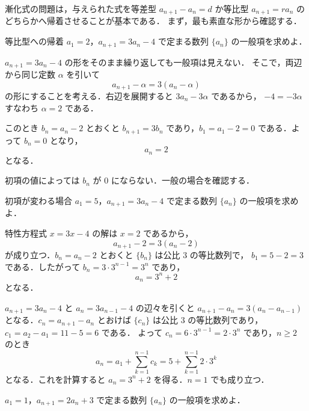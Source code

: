 \documentclass[lualatex,paper=b5j,fontsize=10pt,twoside]{jlreq}
\begin{document}
\MakeMathMagazineTitle

漸化式の問題は，与えられた式を等差型 $a_{n+1}-a_n=d$ か等比型
$a_{n+1}=ra_n$ のどちらかへ帰着させることが基本である．
まず，最も素直な形から確認する．

\begin{mmexample}[1.1]{等比型への帰着}
$a_1=2$，$a_{n+1}=3a_n-4$ で定まる数列 $\{a_n\}$ の一般項を求めよ．
\end{mmexample}

\begin{mmsolution}
$a_{n+1}=3a_n-4$ の形をそのまま繰り返しても一般項は見えない．
そこで，両辺から同じ定数 $\alpha$ を引いて
\[
  a_{n+1}-\alpha=3(a_n-\alpha)
\]
の形にすることを考える．右辺を展開すると $3a_n-3\alpha$ であるから，
$-4=-3\alpha$ すなわち $\alpha=2$ である．

このとき $b_n=a_n-2$ とおくと $b_{n+1}=3b_n$ であり，$b_1=a_1-2=0$
である．よって $b_n=0$ となり，
\[
  a_n=2
\]
となる．
\end{mmsolution}


初項の値によっては $b_n$ が $0$ にならない．一般の場合を確認する．

\begin{mmexample}[1.2]{初項が変わる場合}
$a_1=5$，$a_{n+1}=3a_n-4$ で定まる数列 $\{a_n\}$ の一般項を求めよ．
\end{mmexample}

\begin{mmsolution}
特性方程式 $x=3x-4$ の解は $x=2$ であるから，
\[
  a_{n+1}-2=3(a_n-2)
\]
が成り立つ．$b_n=a_n-2$ とおくと $\{b_n\}$ は公比 $3$ の等比数列で，
$b_1=5-2=3$ である．したがって $b_n=3\cdot 3^{n-1}=3^n$ であり，
\[
  a_n=3^n+2
\]
となる．
\end{mmsolution}

$a_{n+1}=3a_n-4$ と $a_n=3a_{n-1}-4$ の辺々を引くと
$a_{n+1}-a_n=3(a_n-a_{n-1})$ となる．$c_n=a_{n+1}-a_n$ とおけば
$\{c_n\}$ は公比 $3$ の等比数列であり，$c_1=a_2-a_1=11-5=6$ である．
よって $c_n=6\cdot 3^{n-1}=2\cdot 3^n$ であり，$n\geq 2$ のとき
\[
  a_n=a_1+\sum_{k=1}^{n-1}c_k=5+\sum_{k=1}^{n-1}2\cdot 3^k
\]
となる．これを計算すると $a_n=3^n+2$ を得る．$n=1$ でも成り立つ．



\begin{mmproblem}[1.1]{}
$a_1=1$，$a_{n+1}=2a_n+3$ で定まる数列 $\{a_n\}$ の一般項を求めよ．
\end{mmproblem}
\end{document}
